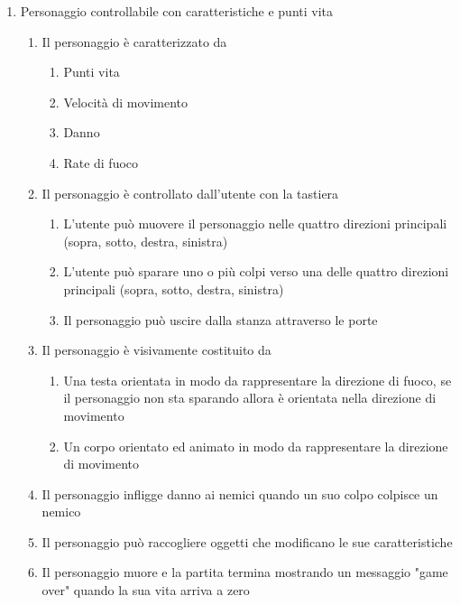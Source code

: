 \begin{enumerate}
\begin{enumerate}
    \end{enumerate}
    
    \item Personaggio controllabile con caratteristiche e punti vita
    \begin{enumerate}
        \item Il personaggio è caratterizzato da
            \begin{enumerate}
                \item Punti vita
                \item Velocità di movimento
                \item Danno
                \item Rate di fuoco
            \end{enumerate}
        \item Il personaggio è controllato dall'utente con la tastiera
        \begin{enumerate}
            \item L'utente può muovere il personaggio nelle quattro direzioni principali (sopra, sotto, destra, sinistra)
            \item L'utente può sparare uno o più colpi verso una delle quattro direzioni principali (sopra, sotto, destra, sinistra)
            \item Il personaggio può uscire dalla stanza attraverso le porte
        \end{enumerate}
        \item Il personaggio è visivamente costituito da
        \begin{enumerate}
            \item Una testa orientata in modo da rappresentare la direzione di fuoco, se il personaggio non sta sparando allora è orientata nella direzione di movimento
            \item Un corpo orientato ed animato in modo da rappresentare la direzione di movimento
        \end{enumerate}
        \item Il personaggio infligge danno ai nemici quando un suo colpo colpisce un nemico
        \item Il personaggio può raccogliere oggetti che modificano le sue caratteristiche
        \item Il personaggio muore e la partita termina mostrando un messaggio "game over" quando la sua vita arriva a zero
    \end{enumerate}
    

\end{enumerate}
